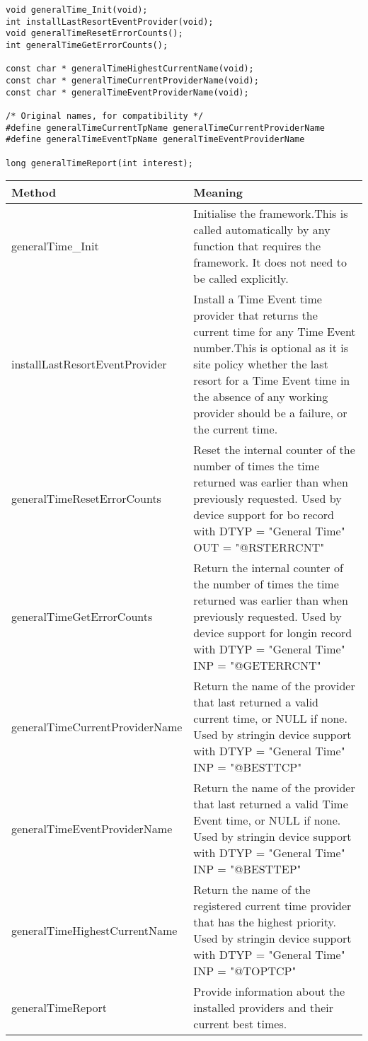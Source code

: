 \begin{verbatim}void generalTime_Init(void);
int installLastResortEventProvider(void);
void generalTimeResetErrorCounts();
int generalTimeGetErrorCounts();

const char * generalTimeHighestCurrentName(void);
const char * generalTimeCurrentProviderName(void);
const char * generalTimeEventProviderName(void);

/* Original names, for compatibility */
#define generalTimeCurrentTpName generalTimeCurrentProviderName
#define generalTimeEventTpName generalTimeEventProviderName

long generalTimeReport(int interest);
\end{verbatim}
\begin{center}\begin{longtable}{p{2.0in}p{4.75in}}
\textbf{Method} & \textbf{Meaning}\\
\hline
generalTime\_Init & Initialise the framework.This is called automatically by any function that requires the framework. It does not need to be called explicitly.\\
installLastResortEventProvider & Install a Time Event time provider that returns the current time for any Time Event number.This is optional as it is site policy whether the last resort for a Time Event time in the absence of any working provider should be a failure, or the current time.\\
generalTimeResetErrorCounts & Reset the internal counter of the number of times the time returned was earlier than when previously requested.  Used by device support for bo record with DTYP = "General Time" OUT = "@RSTERRCNT"\\
generalTimeGetErrorCounts & Return the internal counter of the number of times the time returned was earlier than when previously requested.  Used by device support for longin record with DTYP = "General Time" INP = "@GETERRCNT"\\
generalTimeCurrentProviderName & Return the name of the provider that last returned a valid current time, or NULL if none.  Used by stringin device support with DTYP = "General Time" INP = "@BESTTCP"\\
generalTimeEventProviderName & Return the name of the provider that last returned a valid Time Event time, or NULL if none.  Used by stringin device support with DTYP = "General Time" INP = "@BESTTEP"\\
generalTimeHighestCurrentName & Return the name of the registered current time provider that has the highest priority.  Used by stringin device support with DTYP = "General Time" INP = "@TOPTCP"\\
generalTimeReport & Provide information about the installed providers and their current best times.
\end{longtable}\end{center}


